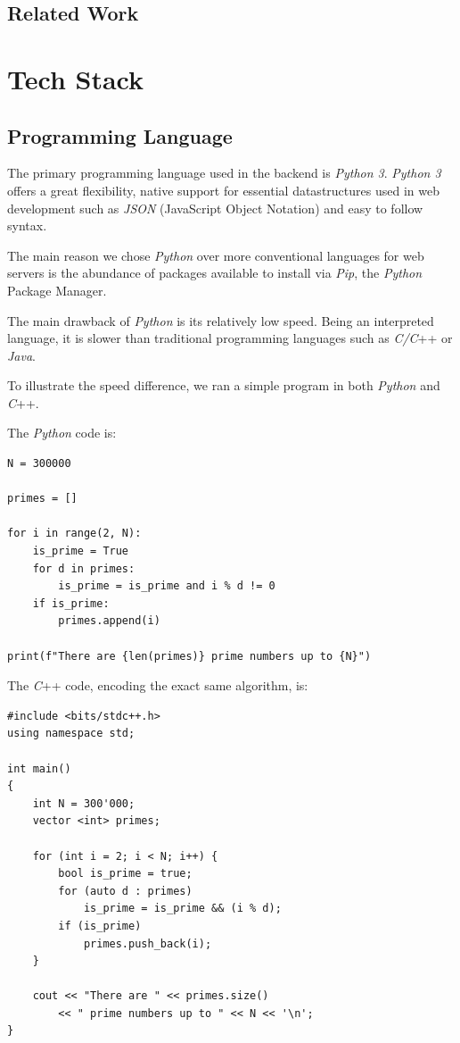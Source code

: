 \documentclass[11pt, a4paper]{report}
\begin{document}
\section{Related Work}


\chapter{Tech Stack}

\section{Programming Language}

The primary programming language used in the backend is \textit{Python 3}.
\textit{Python 3} offers a great flexibility, native support for essential datastructures used in web development such as \textit{JSON} (JavaScript Object Notation) and easy to follow syntax.

The main reason we chose \textit{Python} over more conventional languages for web servers is the abundance of packages available to install via \textit{Pip}, the \textit{Python} Package Manager.

The main drawback of \textit{Python} is its relatively low speed. Being an interpreted language, it is slower than traditional programming languages such as \textit{C/C}++ or \textit{Java}.

To illustrate the speed difference, we ran a simple program in both \textit{Python} and \textit{C}++.

The \textit{Python} code is:

\begin{verbatim}
N = 300000

primes = []

for i in range(2, N):
    is_prime = True
    for d in primes:
        is_prime = is_prime and i % d != 0
    if is_prime:
        primes.append(i)

print(f"There are {len(primes)} prime numbers up to {N}")
\end{verbatim}

The \textit{C}++ code, encoding the exact same algorithm, is:
\begin{verbatim}
#include <bits/stdc++.h>
using namespace std;

int main()
{
    int N = 300'000;
    vector <int> primes;

    for (int i = 2; i < N; i++) {
        bool is_prime = true;
        for (auto d : primes)
            is_prime = is_prime && (i % d);
        if (is_prime)
            primes.push_back(i);
    }

    cout << "There are " << primes.size()
        << " prime numbers up to " << N << '\n';
}
\end{verbatim}
\end{document}
